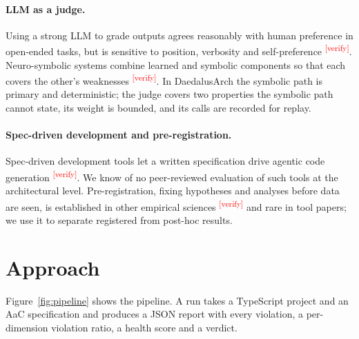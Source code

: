 \documentclass[10pt,a4paper]{article}
\newcommand{\citeneeded}[1]{\cite{#1}\textsuperscript{\textcolor{red}{\tiny[verify]}}}
\newcommand{\tool}{DaedalusArch}
\begin{document}
\paragraph{LLM as a judge.}
Using a strong LLM to grade outputs agrees reasonably with human preference in open-ended tasks, but is sensitive to
position, verbosity and self-preference \citeneeded{zheng2023judging,wang2023fair,panickssery2024self}. Neuro-symbolic
systems combine learned and symbolic components so that each covers the other's weaknesses
\citeneeded{garcez2023neurosymbolic}. In \tool{} the symbolic path is primary and deterministic; the judge covers
two properties the symbolic path cannot state, its weight is bounded, and its calls are recorded for replay.

\paragraph{Spec-driven development and pre-registration.}
Spec-driven development tools let a written specification drive agentic code generation
\citeneeded{speckit2025,kiro2025}. We know of no peer-reviewed evaluation of such tools at the architectural level.
Pre-registration, fixing hypotheses and analyses before data are seen, is established in other empirical sciences
\citeneeded{nosek2018prereg} and rare in tool papers; we use it to separate registered from post-hoc results.

\section{Approach}\label{sec:approach}

Figure~\ref{fig:pipeline} shows the pipeline. A run takes a TypeScript project and an AaC specification and
produces a JSON report with every violation, a per-dimension violation ratio, a health score and a verdict.
\end{document}
